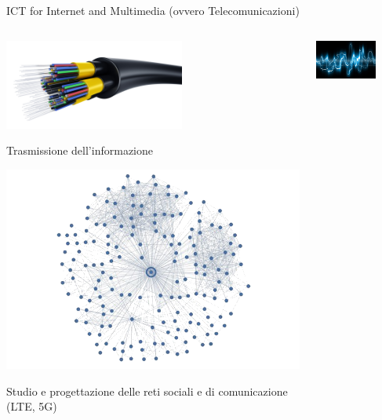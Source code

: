 \documentclass{beamer}
\begin{document}
	\begin{frame}{ICT for Internet and Multimedia (ovvero Telecomunicazioni)}
		\begin{columns}
			\begin{column}{0.4\textwidth}
				\centering
				\includegraphics[width=0.6\textwidth]{trasmissione.png}

				Trasmissione dell'informazione

				\vspace{0.5cm}
				\includegraphics[width=\textwidth]{Grafo.png}

				Studio e progettazione delle reti sociali e di comunicazione (LTE, 5G)
			\end{column}
			\begin{column}{0.4\textwidth}
				\centering
				\includegraphics[width=0.7\textwidth]{signals.jpeg}


\end{column}
\end{columns}
\end{frame}
\end{document}
